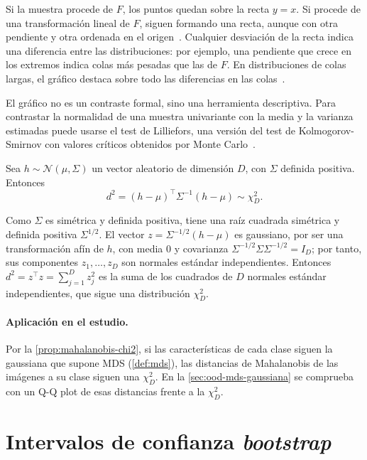 Si la muestra procede de $F$, los puntos quedan sobre la recta $y = x$. Si procede de una transformación lineal de $F$, siguen formando una recta, aunque con otra pendiente y otra ordenada en el origen~\cite[sec.~4.2]{wilk1968}. Cualquier desviación de la recta indica una diferencia entre las distribuciones: por ejemplo, una pendiente que crece en los extremos indica colas más pesadas que las de $F$. En distribuciones de colas largas, el gráfico destaca sobre todo las diferencias en las colas~\cite[sec.~4.2]{wilk1968}.

El gráfico no es un contraste formal, sino una herramienta descriptiva. Para contrastar la normalidad de una muestra univariante con la media y la varianza estimadas puede usarse el test de Lilliefors, una versión del test de Kolmogorov-Smirnov con valores críticos obtenidos por Monte Carlo~\cite{lilliefors1967}.

\begin{proposicion}\label{prop:mahalanobis-chi2}
Sea $h \sim \mathcal{N}(\mu, \Sigma)$ un vector aleatorio de dimensión $D$, con $\Sigma$ definida positiva. Entonces
\[
  d^2 = (h - \mu)^{\top} \Sigma^{-1} (h - \mu) \sim \chi^2_D.
\]
\end{proposicion}
\begin{demostracion}
Como $\Sigma$ es simétrica y definida positiva, tiene una raíz cuadrada simétrica y definida positiva $\Sigma^{1/2}$. El vector $z = \Sigma^{-1/2}(h - \mu)$ es gaussiano, por ser una transformación afín de $h$, con media $0$ y covarianza $\Sigma^{-1/2} \Sigma \Sigma^{-1/2} = I_D$; por tanto, sus componentes $z_1, \dots, z_D$ son normales estándar independientes. Entonces $d^2 = z^{\top} z = \sum_{j=1}^{D} z_j^2$ es la suma de los cuadrados de $D$ normales estándar independientes, que sigue una distribución $\chi^2_D$.
\end{demostracion}

\paragraph{Aplicación en el estudio.} Por la \cref{prop:mahalanobis-chi2}, si las características de cada clase siguen la gaussiana que supone MDS (\cref{def:mds}), las distancias de Mahalanobis de las imágenes a su clase siguen una $\chi^2_D$. En la \cref{sec:ood-mds-gaussiana} se comprueba con un Q-Q plot de esas distancias frente a la $\chi^2_D$.

\section{Intervalos de confianza \emph{bootstrap}}\label{sec:bootstrap}

